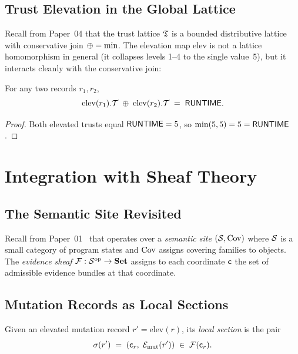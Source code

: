\documentclass[11pt]{article}
\newcommand{\elevate}{\mathrm{elev}}             %
\newcommand{\MutEvid}{{\mathcal{E}_{\mathrm{mut}}}}%
\newcommand{\LocSec}{\sigma}                     %
\begin{document}
\subsection{Trust Elevation in the Global Lattice}
\label{subsec:global-lattice}

Recall from Paper~04 that the trust lattice $\mathfrak{T}$ is a bounded
distributive lattice with conservative join $\oplus = \min$.  The
elevation map $\elevate$ is not a lattice homomorphism in general
(it collapses levels 1--4 to the single value~5), but it interacts
cleanly with the conservative join:

\begin{proposition}
\label{prop:elev-join}
For any two records $r_1, r_2$,
\[
  \elevate(r_1).\trust \;\tjoin\; \elevate(r_2).\trust
  \;=\; \Truntime.
\]
\end{proposition}
\begin{proof}
Both elevated trusts equal $\mathsf{RUNTIME} = 5$, so
$\min(5, 5) = 5 = \mathsf{RUNTIME}$.
\end{proof}

\section{Integration with Sheaf Theory}
\label{sec:sheaf}

\subsection{The Semantic Site Revisited}
\label{subsec:site}

Recall from Paper~01~\cite{paper01-sites} that \JuGeo{} operates over a
\emph{semantic site} $(\mathcal{S}, \mathrm{Cov})$ where $\mathcal{S}$ is a small category
of program states and $\mathrm{Cov}$ assigns covering families to objects.
The \emph{evidence sheaf} $\mathcal{F} : \mathcal{S}^{\mathrm{op}} \to
\mathbf{Set}$ assigns to each coordinate $\mathsf{c}$ the set of
admissible evidence bundles at that coordinate.

\subsection{Mutation Records as Local Sections}
\label{subsec:sections}

\begin{definition}
\label{def:local-section}
Given an elevated mutation record $r' = \elevate(r)$, its
\emph{local section} is the pair
\[
  \LocSec(r') \;=\; (\coord_r,\;\MutEvid(r'))
  \;\in\; \mathcal{F}(\coord_r).
\]
\end{definition}
\end{document}
